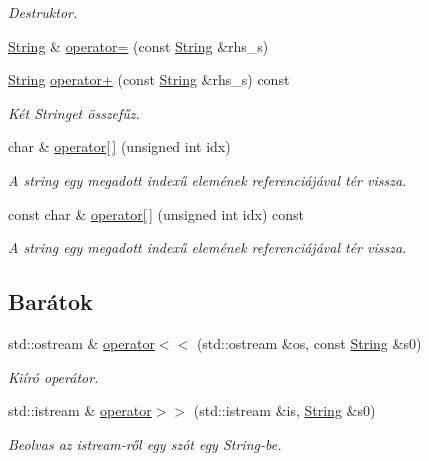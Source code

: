 \begin{DoxyCompactItemize}
\begin{DoxyCompactList}\small\item\em Destruktor. \end{DoxyCompactList}\item 
\hyperlink{class_string}{String} \& \hyperlink{class_string_a803e6112834d4c0cdb0da6c6a4000e6e}{operator=} (const \hyperlink{class_string}{String} \&rhs\-\_\-s)
\item 
\hyperlink{class_string}{String} \hyperlink{class_string_a189071e4e59316603d720413ea166c77}{operator+} (const \hyperlink{class_string}{String} \&rhs\-\_\-s) const 
\begin{DoxyCompactList}\small\item\em Két Stringet összefűz. \end{DoxyCompactList}\item 
char \& \hyperlink{class_string_a1a7c5c39d4dafbbf8516f5058a253f1a}{operator\mbox{[}$\,$\mbox{]}} (unsigned int idx)
\begin{DoxyCompactList}\small\item\em A string egy megadott indexű elemének referenciájával tér vissza. \end{DoxyCompactList}\item 
const char \& \hyperlink{class_string_aa2cd8e755a2bc70e8ad11708a154d7a3}{operator\mbox{[}$\,$\mbox{]}} (unsigned int idx) const 
\begin{DoxyCompactList}\small\item\em A string egy megadott indexű elemének referenciájával tér vissza. \end{DoxyCompactList}\end{DoxyCompactItemize}
\subsection*{Barátok}
\begin{DoxyCompactItemize}
\item 
std\-::ostream \& \hyperlink{class_string_aef14876e55f43fb4ffa7b91664467ecb}{operator$<$$<$} (std\-::ostream \&os, const \hyperlink{class_string}{String} \&s0)
\begin{DoxyCompactList}\small\item\em Kiíró operátor. \end{DoxyCompactList}\item 
std\-::istream \& \hyperlink{class_string_aea8ed420ad5e70828bc42b0fb9b49366}{operator$>$$>$} (std\-::istream \&is, \hyperlink{class_string}{String} \&s0)
\begin{DoxyCompactList}\small\item\em Beolvas az istream-\/ről egy szót egy String-\/be. \end{DoxyCompactList}\end{DoxyCompactItemize}


